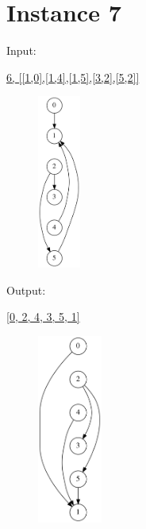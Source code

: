 \documentclass[10pt]{article}
\begin{document}
\section*{Instance 7}

\squishlist
  \item \parbox{40pt}{Input:}  \url{6, [[1,0],[1,4],[1,5],[3,2],[5,2]]}
\squishend
\begin{figure}[h!]
  \hspace{50pt}
  \hspace{50pt}
  \hspace{50pt}
  \includegraphics[width=40pt]{Input/Graph_7b.gv.png}
\end{figure}

\squishlist
  \item \parbox{40pt}{Output:} \url{[0, 2, 4, 3, 5, 1]}
\squishend
\begin{figure}[h!]
  \hspace{50pt}
  \includegraphics[width=60pt]{Output/Graph_7_soln.gv.png}
\end{figure}
\end{document}
